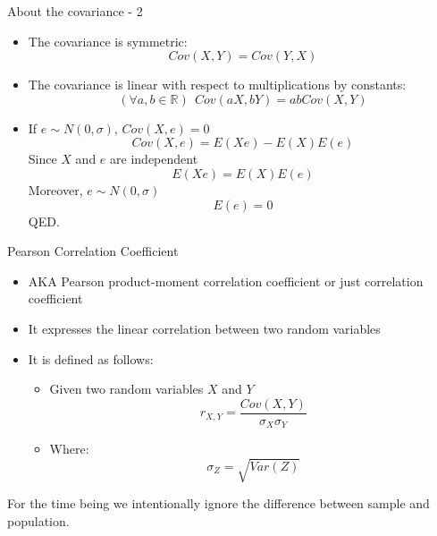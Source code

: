 \documentclass{beamer}
\begin{document}
\begin{frame}
{\centerline{About the covariance - 2}} \label{P:Covariance2}

\begin{itemize}
\item The covariance is symmetric:
 $$Cov(X,Y) = Cov(Y,X)$$
\item The covariance is linear with respect to multiplications by constants:
 $$(\forall a, b \in \mathbb{R}) ~~ Cov(aX,bY) = abCov(X,Y)$$

\item If $e \sim N(0,\sigma)$, $Cov(X,e) = 0$ \\
$$Cov(X,e) =  E(Xe) - E(X)E(e)$$
Since  $X$ and $e$ are independent
$$ E(Xe) = E(X)E(e)$$
Moreover,  $e \sim N(0,\sigma)$
$$E(e) = 0$$
QED.
\end{itemize}


\end{frame}


\begin{frame}
{\centerline{Pearson Correlation Coefficient}} \label{P:Pearson}

\begin{itemize}
\item AKA Pearson product-moment correlation coefficient or just correlation coefficient
\item It expresses the linear correlation between two random variables
\item It is defined as follows:
\begin{itemize}
\item Given two random variables $X$ and $Y$
$$r_{X,Y} = \frac{Cov(X,Y)}{\sigma_X\sigma_Y}$$
\item Where:
$$\sigma_Z = \sqrt{Var(Z)}$$
\end{itemize}
\end{itemize}

\vspace*{0.5cm}

\begin{center}
\small  For the time being we intentionally ignore the difference between sample and population.
\end{center}

\end{frame}
\end{document}
